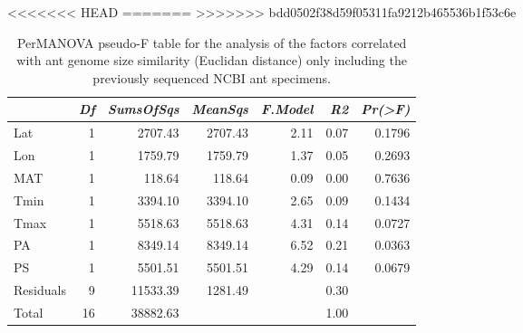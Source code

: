 <<<<<<< HEAD
=======
>>>>>>> bdd0502f38d59f05311fa9212b465536b1f53c6e
\begin{table}[ht]
\centering
\begin{tabular}{lrrrrrr}
  \hline
 & {\emph{Df}} & {\emph{SumsOfSqs}} & {\emph{MeanSqs}} & {\emph{F.Model}} & {\emph{R2}} & {\emph{Pr(>F)}} \\ 
  \hline
Lat & 1 & 2707.43 & 2707.43 & 2.11 & 0.07 & 0.1796 \\ 
  Lon & 1 & 1759.79 & 1759.79 & 1.37 & 0.05 & 0.2693 \\ 
  MAT & 1 & 118.64 & 118.64 & 0.09 & 0.00 & 0.7636 \\ 
  Tmin & 1 & 3394.10 & 3394.10 & 2.65 & 0.09 & 0.1434 \\ 
  Tmax & 1 & 5518.63 & 5518.63 & 4.31 & 0.14 & 0.0727 \\ 
  PA & 1 & 8349.14 & 8349.14 & 6.52 & 0.21 & 0.0363 \\ 
  PS & 1 & 5501.51 & 5501.51 & 4.29 & 0.14 & 0.0679 \\ 
  Residuals & 9 & 11533.39 & 1281.49 &  & 0.30 &  \\ 
  Total & 16 & 38882.63 &  &  & 1.00 &  \\ 
   \hline
\end{tabular}
\caption{PerMANOVA pseudo-F table for the analysis of the factors 
correlated with ant genome size similarity (Euclidan distance) only including the 
previously sequenced NCBI ant specimens.} 
\label{tab:perm_size_napg}
\end{table}
